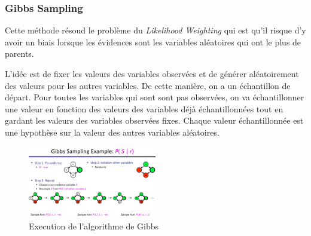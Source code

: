 \subsubsection{Gibbs Sampling} %
\label{sec:gibbs_sampling} 

Cette méthode résoud le problème du \textit{Likelihood Weighting} qui est qu'il risque 
d'y avoir un biais lorsque les évidences sont les variables aléatoires qui ont le plus de parents.

L'idée est de fixer les valeurs des variables observées et de générer aléatoirement des valeurs pour les autres variables. 
De cette manière, on a un échantillon de départ. Pour toutes les variables qui sont sont pas observées, on va échantillonner une valeur en fonction des valeurs des variables déjà échantillonnées tout en 
gardant les valeurs des variables observées fixes.
Chaque valeur échantillonnée est une hypothèse sur la valeur des autres variables aléatoires.

\begin{figure}[H]
    \begin{center}
        \includegraphics[width=0.5\textwidth]{../pictures/gibbs.png}
    \end{center}
    \caption{Execution de l'algorithme de Gibbs}\label{fig:gibbs}
\end{figure}





















